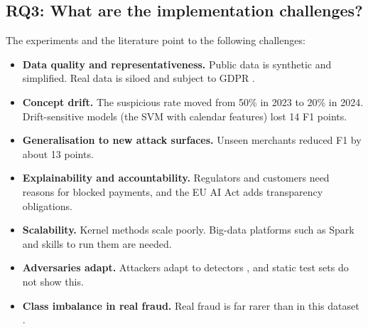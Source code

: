 \documentclass[12pt,a4paper]{article}
\begin{document}
\subsection{RQ3: What are the implementation challenges?}
The experiments and the literature point to the following challenges:
\begin{itemize}[nosep]
\item \textbf{Data quality and representativeness.} Public data is synthetic and simplified. Real data is siloed and subject to GDPR \citep{hasan2023bigdata, gdpr2016}.
\item \textbf{Concept drift.} The suspicious rate moved from 50\% in 2023 to 20\% in 2024. Drift-sensitive models (the SVM with calendar features) lost 14 F1 points.
\item \textbf{Generalisation to new attack surfaces.} Unseen merchants reduced F1 by about 13 points.
\item \textbf{Explainability and accountability.} Regulators and customers need reasons for blocked payments, and the EU AI Act \citep{euaiact2024} adds transparency obligations.
\item \textbf{Scalability.} Kernel methods scale poorly. Big-data platforms such as Spark \citep{zaharia2016spark} and skills to run them are needed.
\item \textbf{Adversaries adapt.} Attackers adapt to detectors \citep{padmanaban2026actp}, and static test sets do not show this.
\item \textbf{Class imbalance in real fraud.} Real fraud is far rarer than in this dataset \citep{zhang2025intelligent}.
\end{itemize}
\end{document}
